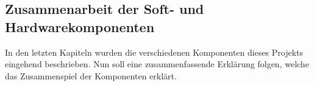 \subsection{Zusammenarbeit der Soft- und Hardwarekomponenten}

In den letzten Kapiteln wurden die verschiedenen Komponenten dieses Projekts eingehend beschrieben. Nun soll eine zusammenfassende Erklärung folgen, welche
das Zusammenspiel der Komponenten erklärt.

